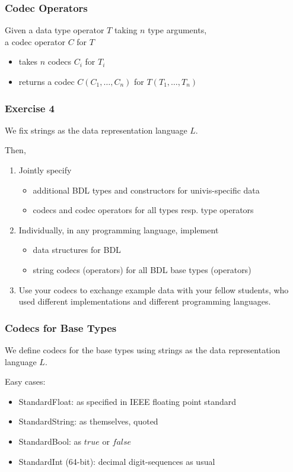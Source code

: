 \documentclass{beamer}
\begin{document}
\begin{frame}\frametitle{Codec Operators}
Given a data type operator $T$ taking $n$ type arguments,\\
a codec operator $C$ for $T$
\begin{itemize}
 \item takes $n$ codecs $C_i$ for $T_i$
 \item returns a codec $C(C_1,\ldots,C_n)$ for $T(T_1,\ldots,T_n)$
\end{itemize}
\end{frame}

\begin{frame}\frametitle{Exercise 4}
We fix strings as the data representation language $L$.

Then, 
\begin{enumerate}
 \item Jointly specify
  \begin{itemize}
  \item additional BDL types and constructors for univis-specific data
  \item codecs and codec operators for all types resp. type operators
  \end{itemize}
 \item Individually, in any programming language, implement
  \begin{itemize}
   \item data structures for BDL
   \item string codecs (operators) for all BDL base types (operators)
  \end{itemize}
 \item Use your codecs to exchange example data with your fellow students, who used different implementations and different programming languages.
\end{enumerate}
\end{frame}

\begin{frame}\frametitle{Codecs for Base Types}
We define codecs for the base types using strings as the data representation language $L$.

Easy cases:
\begin{itemize}
\item StandardFloat: as specified in IEEE floating point standard
\item StandardString: as themselves, quoted
\item StandardBool: as $true$ or $false$
\item StandardInt (64-bit): decimal digit-sequences as usual
\end{itemize}
\end{frame}
\end{document}
